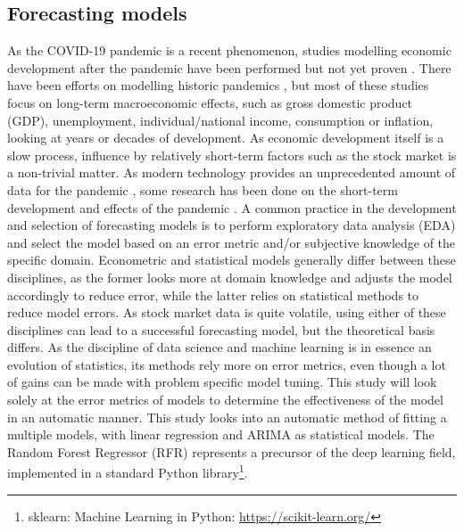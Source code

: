 \subsection{Forecasting models}
As the COVID-19 pandemic is a recent phenomenon, studies modelling economic development after the pandemic have been performed but not yet proven \cite{chudik2020economic, baldwin2020economics, fernandes2020economic}. There have been efforts on modelling historic pandemics \cite{osterholm2017preparing, correia1918pandemics, jorda2020longer}, but most of these studies focus on long-term macroeconomic effects, such as gross domestic product (GDP), unemployment, individual/national income, consumption or inflation, looking at years or decades of development. As economic development itself is a slow process, influence by relatively short-term factors such as the stock market is a non-trivial matter. As modern technology provides an unprecedented amount of data for the pandemic \cite{dong2020interactive, hale2020variation}, some research has been done on the short-term development and effects of the pandemic \cite{zhao2020preliminary, deb2020economic, carpi2021twitter}.
A common practice in the development and selection of forecasting models is to perform exploratory data analysis (EDA) and select the model based on an error metric and/or subjective knowledge of the specific domain. Econometric and statistical models generally differ between these disciplines, as the former looks more at domain knowledge and adjusts the model accordingly to reduce error, while the latter relies on statistical methods to reduce model errors. As stock market data is quite volatile, using either of these disciplines can lead to a successful forecasting model, but the theoretical basis differs. As the discipline of data science and machine learning is in essence an evolution of statistics, its methods rely more on error metrics, even though a lot of gains can be made with problem specific model tuning. This study will look solely at the error metrics of models to determine the effectiveness of the model in an automatic manner.
This study looks into an automatic method of fitting a multiple models, with linear regression and ARIMA as statistical models. The Random Forest Regressor (RFR) represents a precursor of the deep learning \cite{lecun2015deep} field, implemented in a standard Python library\footnote{sklearn: Machine Learning in Python: \url{https://scikit-learn.org/}}. %

